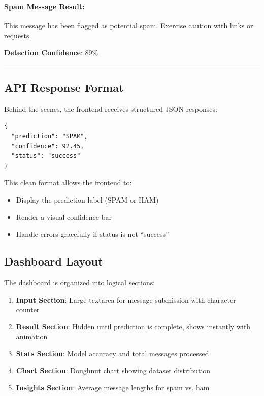 \documentclass[12pt, a4paper]{article}
\begin{document}
\paragraph{Spam Message Result:}
\begin{center}
\begin{tcolorbox}[colback=white, colframe=danger, title=\textbf{[WARN] Spam Detected}]
    This message has been flagged as potential spam. Exercise caution with links or requests.
    
    \textbf{Detection Confidence}: 89\%
    
    \textcolor{danger}{\rule{0.75\textwidth}{5pt}}
\end{tcolorbox}
\end{center}

\subsection{API Response Format}

Behind the scenes, the frontend receives structured JSON responses:

\begin{verbatim}
{
  "prediction": "SPAM",
  "confidence": 92.45,
  "status": "success"
}
\end{verbatim}

This clean format allows the frontend to:
\begin{itemize}
    \item Display the prediction label (SPAM or HAM)
    \item Render a visual confidence bar
    \item Handle errors gracefully if status is not ``success''
\end{itemize}

\subsection{Dashboard Layout}

The dashboard is organized into logical sections:

\begin{enumerate}
    \item \textbf{Input Section}: Large textarea for message submission with character counter
    \item \textbf{Result Section}: Hidden until prediction is complete, shows instantly with animation
    \item \textbf{Stats Section}: Model accuracy and total messages processed
    \item \textbf{Chart Section}: Doughnut chart showing dataset distribution
    \item \textbf{Insights Section}: Average message lengths for spam vs. ham
\end{enumerate}
\end{document}
